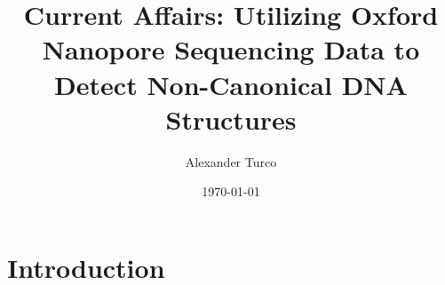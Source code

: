 \documentclass{beamer}
\title[BEAP Dec 2022]{Current Affairs: Utilizing Oxford Nanopore Sequencing Data to Detect Non-Canonical DNA Structures}
\author{Alexander Turco}
\date{\today}
\begin{document}
	
	\section{Introduction}
	\begin{frame}
		\titlepage 
		\begin{center}
		\end{center}
	\end{frame}
	
	\logo{}
	
		
				

	
	
\end{document}
